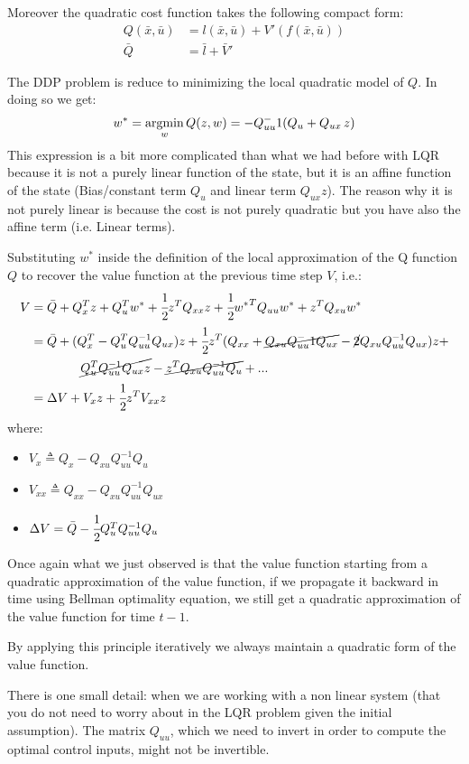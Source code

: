 Moreover the quadratic cost function takes the following compact form:
\begin{align*}
Q(\bar{x}, \bar{u}) &= l(\bar{x}, \bar{u}) + V'(f(\bar{x}, \bar{u}))\\
\bar{Q} &= \bar{l} + \bar{V}'
\end{align*}

The DDP problem is reduce to minimizing the local quadratic model of $Q$. In doing so we get:
\[w^* = \operatorname*{argmin}_w Q(z, w) = -Q_{uu}^-1 (Q_u + Q_{ux}\,z)\]
This expression is a bit more complicated than what we had before with LQR because it is not a purely linear function of the state, but it is an affine function of the state (Bias/constant term $Q_u$ and linear term $Q_{ux}z$).
The reason why it is not purely linear is because the cost is not purely quadratic but you have also the affine term (i.e. Linear terms).

Substituting $w^*$ inside the definition of the local approximation of the Q function $Q$ to recover the value function at the previous time step $V$, i.e.:
\begin{align*}
V &= \bar{Q} + Q_x^Tz + Q_u^Tw^* + \cfrac{1}{2}z^TQ_{xx}z + \cfrac{1}{2}{w^*}^TQ_{uu}w^* + z^TQ_{xu}w^*\\
&= \bar{Q} + (Q_x^T - Q_u^TQ_{uu}^{-1}Q_{ux})z + \cfrac{1}{2}z^T(Q_{xx} + \cancel{Q_{xu} Q_{uu}^-1 Q_{ux}} - \cancel{2}Q_{xu}Q_{uu}^{-1}Q_{ux})z + \\
& \qquad\qquad\cancel{Q_u^TQ_{uu}^{-1}Q_{ux}z} - \cancel{z^TQ_{xu}Q_{uu}^{-1}Q_u} + ...\\
&= \Delta V + V_xz + \cfrac{1}{2}z^TV_{xx}z
\end{align*}
where:
\begin{itemize}
\item $V_x \triangleq Q_x - Q_{xu}Q_{uu}^{-1}Q_u$
\item $V_{xx}\triangleq Q_{xx}-Q_{xu}Q_{uu}^{-1}Q_{ux}$
\item $\Delta V = \bar{Q} - \cfrac{1}{2} Q_u^T Q_{uu}^{-1} Q_u$
\end{itemize}

Once again what we just observed is that the value function starting from a quadratic approximation of the value function, if we propagate it backward in time using Bellman optimality equation, we still get a quadratic approximation of the value function for time $t-1$.

By applying this principle iteratively we always maintain a quadratic form of the value function.

There is one small detail: when we are working with a non linear system (that you do not need to worry about in the LQR problem given the initial assumption).
The matrix $Q_{uu}$, which we need to invert in order to compute the optimal control inputs, might not be invertible.

